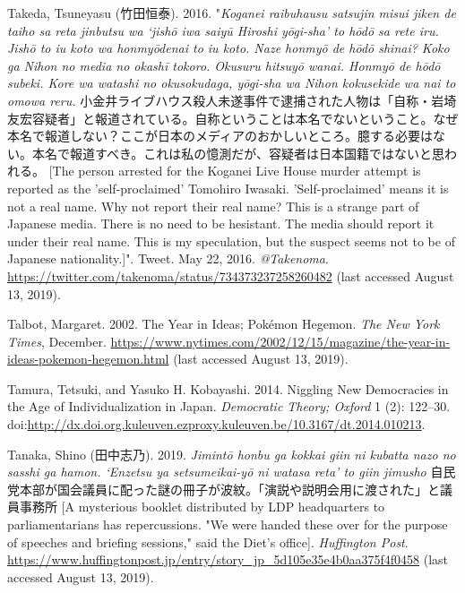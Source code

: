 \documentclass[10pt,british,A4paper,twoside]{memoir}
\begin{document}
\hypertarget{ref-takeda_eng._2016}{}
Takeda, Tsuneyasu (竹田恒泰). 2016. "\emph{Koganei raibuhausu satsujin misui jiken de taiho sa reta jinbutsu wa `jishō iwa saiyū Hiroshi yōgi-sha' to hōdō sa rete iru. Jishō to iu koto wa honmyōdenai to iu koto. Naze honmyō de hōdō shinai? Koko ga Nihon no media no okashī tokoro. Okusuru hitsuyō wanai. Honmyō de hōdō subeki. Kore wa watashi no okusokudaga, yōgi-sha wa Nihon kokusekide wa nai to omowa reru.} 小金井ライブハウス殺人未遂事件で逮捕された人物は「自称・岩埼友宏容疑者」と報道されている。自称ということは本名でないということ。なぜ本名で報道しない？ここが日本のメディアのおかしいところ。臆する必要はない。本名で報道すべき。これは私の憶測だが、容疑者は日本国籍ではないと思われる。 [The person arrested for the Koganei Live House murder attempt is reported as the 'self-proclaimed' Tomohiro Iwasaki. 'Self-proclaimed' means it is not a real name. Why not report their real name? This is a strange part of Japanese media. There is no need to be hesistant. The media should report it under their real name. This is my speculation, but the suspect seems not to be of Japanese nationality.]". Tweet. May 22, 2016. \emph{@Takenoma}.
\url{https://twitter.com/takenoma/status/734373237258260482} (last accessed August 13, 2019).

\hypertarget{ref-talbot_year_2002}{}
Talbot, Margaret. 2002. The Year in Ideas; Pokémon Hegemon. \emph{The
New York Times}, December.
\url{https://www.nytimes.com/2002/12/15/magazine/the-year-in-ideas-pokemon-hegemon.html} (last accessed August 13, 2019).

\hypertarget{ref-tamura_niggling_2014}{}
Tamura, Tetsuki, and Yasuko H. Kobayashi. 2014. Niggling New Democracies
in the Age of Individualization in Japan. \emph{Democratic Theory;
Oxford} 1 (2): 122--30.
doi:\href{https://doi.org/http://dx.doi.org.kuleuven.ezproxy.kuleuven.be/10.3167/dt.2014.010213}{http://dx.doi.org.kuleuven.ezproxy.kuleuven.be/10.3167/dt.2014.010213}.

\hypertarget{ref-tanaka_eng._2019}{}
Tanaka, Shino (田中志乃). 2019. \emph{Jimintō honbu ga kokkai giin ni kubatta nazo no sasshi ga hamon. `Enzetsu ya setsumeikai-yō ni watasa reta' to giin jimusho} 自民党本部が国会議員に配った謎の冊子が波紋。「演説や説明会用に渡された」と議員事務所 [A mysterious booklet distributed by LDP headquarters to parliamentarians has repercussions. "We were handed these over for the purpose of speeches and briefing sessions," said the Diet's office]. \emph{Huffington Post}.
\url{https://www.huffingtonpost.jp/entry/story_jp_5d105e35e4b0aa375f4f0458} (last accessed August 13, 2019).
\end{document}
